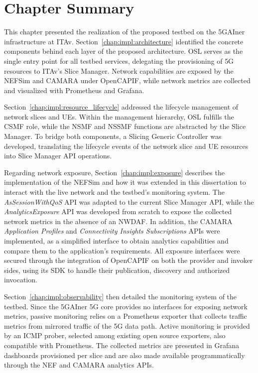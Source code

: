 \section{Chapter Summary}
\label{chap:impl:summary}

This chapter presented the realization of the proposed testbed on the 5GAIner infrastructure at \acs{ITAv}. Section~\ref{chap:impl:architecture} identified the concrete components behind each layer of the proposed architecture. \acs{OSL} serves as the single entry point for all testbed services, delegating the provisioning of \acs{5G} resources to \acs{ITAv}'s Slice Manager. Network capabilities are exposed by the \acs{NEF}Sim and CAMARA under Open\acs{CAPIF}, while network metrics are collected and visualized with Prometheus and Grafana.

Section~\ref{chap:impl:resource_lifecycle} addressed the lifecycle management of network slices and \acsp{UE}. Within the management hierarchy, \acs{OSL} fulfills the \acs{CSMF} role, while the \acs{NSMF} and \acs{NSSMF} functions are abstracted by the Slice Manager. To bridge both components, a Slicing Generic Controller was developed, translating the lifecycle events of the network slice and \acs{UE} resources into Slice Manager \acs{API} operations.

Regarding network exposure, Section~\ref{chap:impl:exposure} describes the implementation of the \acs{NEF}Sim and how it was extended in this dissertation to interact with the live network and the testbed's monitoring system. The \textit{AsSessionWithQoS} \acs{API} was adapted to the current Slice Manager \acs{API}, while the \textit{AnalyticsExposure} \acs{API} was developed from scratch to expose the collected network metrics in the absence of an \acs{NWDAF}. In addition, the CAMARA \textit{Application Profiles} and \textit{Connectivity Insights Subscriptions} \acsp{API} were implemented, as a simplified interface to obtain analytics capabilities and compare them to the application's requirements. All exposure interfaces were secured through the integration of Open\acs{CAPIF} on both the provider and invoker sides, using its \acs{SDK} to handle their publication, discovery and authorized invocation.

Section~\ref{chap:impl:observability} then detailed the monitoring system of the testbed. Since the 5GAIner \acs{5G} core provides no interfaces for exposing network metrics, passive monitoring relies on a Prometheus exporter that collects traffic metrics from mirrored traffic of the \acs{5G} data path. Active monitoring is provided by an \acs{ICMP} prober, selected among existing open source exporters, also compatible with Prometheus. The collected metrics are presented in Grafana dashboards provisioned per slice and are also made available programmatically through the \acs{NEF} and CAMARA analytics \acsp{API}.

